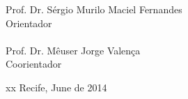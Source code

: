 \begin{titlepage}
  \begin{flushright}
    Prof. Dr. Sérgio Murilo Maciel Fernandes\\
    Orientador\\
    \qquad\\
    Prof. Dr. Mêuser Jorge Valença\\
    Coorientador\\
  \end{flushright}

\begin{center}
  {\color{white} xx}\vfill
  Recife, June de 2014
\end{center}

\end{titlepage}

